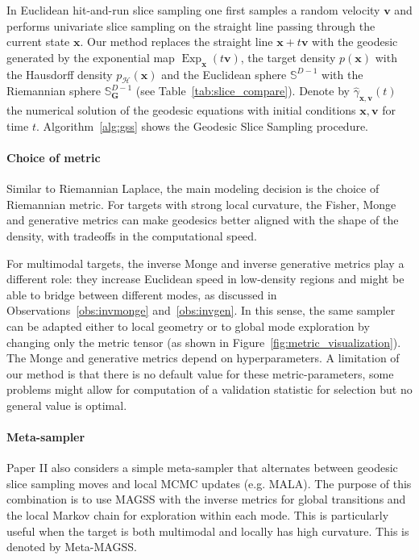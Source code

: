 In Euclidean hit-and-run slice sampling one first samples a random velocity $\boldsymbol{v}$ and performs univariate slice sampling on the straight line passing through the current state $\boldsymbol{x}$. Our method replaces the straight line 
$\boldsymbol{x} + t \boldsymbol{v}$ with the geodesic generated by the exponential map $\operatorname{Exp}_{\boldsymbol{x}}(t\boldsymbol{v})$, the target density $p(\boldsymbol{x})$ with the Hausdorff density $p_{\mathcal{H}}(\boldsymbol{x})$ and the Euclidean sphere $\mathbb{S}^{D-1}$ with the Riemannian sphere $\mathbb{S}^{D-1}_{\mathbf{G}}$  (see Table~\ref{tab:slice_compare}). Denote by  $\hat{\gamma}_{\boldsymbol{x},\boldsymbol{v}}(t)$ the numerical solution of the geodesic equations with initial conditions $\boldsymbol{x},\boldsymbol{v}$ for time $t$. Algorithm~\ref{alg:gss} shows the Geodesic Slice Sampling procedure.

\paragraph{Choice of metric}
Similar to Riemannian Laplace, the main modeling decision is the choice of Riemannian metric. For targets with strong local curvature, the Fisher, Monge and generative metrics can make geodesics better aligned with the shape of the density, with tradeoffs in the computational speed.

For multimodal targets, the inverse Monge and inverse generative metrics play a different role: they increase Euclidean speed in low-density regions and might be able to bridge between different modes, as discussed in Observations~\ref{obs:invmonge} and~\ref{obs:invgen}. In this sense, the same sampler can be adapted either to local geometry or to global mode exploration by changing only the metric tensor (as shown in Figure~\ref{fig:metric_visualization}). 
The Monge and generative metrics depend on hyperparameters. 
A limitation of our method is that there is no default value for these metric-parameters, some problems might allow for computation of a validation statistic for selection but no general value is optimal.


\paragraph{Meta-sampler} Paper II also considers a simple meta-sampler that alternates between geodesic slice sampling moves and local MCMC updates (e.g. MALA). The purpose of this combination is to use MAGSS with the inverse metrics for global transitions and the local Markov chain for exploration within each mode. This is particularly useful when the target is both multimodal and locally has high curvature. This is denoted by Meta-MAGSS. 



